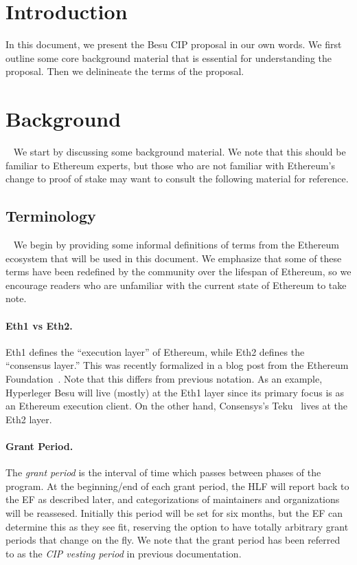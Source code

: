 
\section{Introduction} \label{sec:introduction}

In this document, we present the Besu CIP proposal in our own words.  We first outline some core background material that is essential for understanding the proposal.  Then we delinineate the terms of the proposal.

\section{Background}~\label{sec:background}
We start by discussing some background material.  We note that this should be familiar to Ethereum experts, but those who are not familiar with Ethereum's change to proof of stake may want to consult the following material for reference.

\subsection{Terminology}~\label{sec:defs}
We begin by providing some informal definitions of terms from the Ethereum ecosystem that will be used in this document.  We emphasize that some of these terms have been redefined by the community over the lifespan of Ethereum, so we encourage readers who are unfamiliar with the current state of Ethereum to take note.

\paragraph{Eth1 vs Eth2.}  Eth1 defines the ``execution layer'' of Ethereum, while Eth2 defines the ``consensus layer.''  This was recently formalized in a blog post from the Ethereum Foundation~\cite{Eth1-2}.  Note that this differs from previous notation.  As an example, Hyperleger Besu will live (mostly) at the Eth1 layer since its primary focus is as an Ethereum execution client.  On the other hand, Consensys's Teku~\cite{Teku} lives at the Eth2 layer.

\paragraph{Grant Period.}  The \emph{grant period} is the interval of time which passes between phases of the program.  At the beginning/end of each grant period, the HLF will report back to the EF as described later, and categorizations of maintainers and organizations will be reassesed.  Initially this period will be set for six months, but the EF can determine this as they see fit, reserving the option to have totally arbitrary grant periods that change on the fly.  We note that the grant period has been referred to as the \emph{CIP vesting period} in previous documentation.

